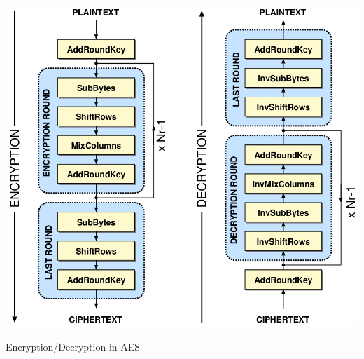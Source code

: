\begin{center}
\vspace{2cm}
\includegraphics[scale=0.3]{images/aes}

\vspace{0.5cm}
Encryption/Decryption in AES\\
\end{center}